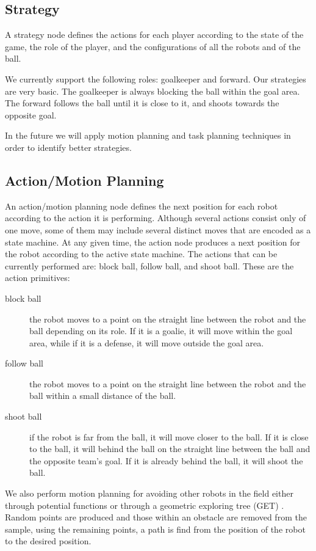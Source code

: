 \documentclass[]{llncs}
\newcommand{\TODO}[1]{{\textcolor{blue}{ToDo: {#1}}}}
\begin{document}
\subsection{Strategy}
A strategy node defines the actions for each player according to the state of the game, the role of the player, and the configurations of all the robots and of the ball. 

We currently support the following roles: goalkeeper and forward. Our strategies are very basic. The goalkeeper is always blocking the ball within the goal area. The forward follows the ball until it is close to it, and shoots towards the opposite goal.


In the future we will apply motion planning and task planning techniques in order to identify better strategies.

\subsection{Action/Motion Planning}
An action/motion planning node defines the next position for each robot according to the action it is performing. Although several actions consist only of one move, some of them may include several distinct moves that are encoded as a state machine. At any given time, the action node produces a next position for the robot according to the active state machine. The actions that can be currently performed are: block ball, follow ball, and shoot ball. These are the action primitives:

\begin{description}
	\item[block ball] the robot moves to a point on the straight line between the robot and the ball depending on its role. If it is a goalie, it will move within the goal area, while if it is a defense, it will move outside the goal area.
	\item[follow ball] the robot moves to a point on the straight line between the robot and the ball within a small distance of the ball.
	\item[shoot ball] if the robot is far from the ball, it will move closer to the ball. If it is close to the ball, it will behind the ball on the straight line between the ball and the opposite team's goal. If it is already behind the ball, it will shoot the ball.
\end{description}

We also perform motion planning for avoiding other robots in the field either through potential functions \cite{k-rtoam-86} or through a geometric exploring tree (GET) \cite{eb-lppidewu-IEEEICMFI-1994}. Random points are produced and those within an obstacle are removed from the sample, using the remaining points, a path is find from the position of the robot to the desired position. 
\end{document}
